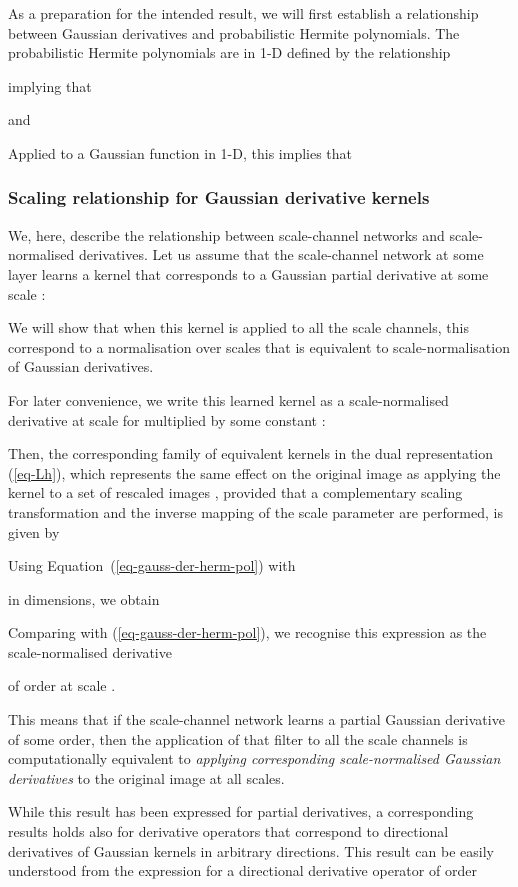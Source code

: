 \documentclass[twocolumn,runningheads]{svjour3}
\begin{document}
As a preparation for the intended result, we will first establish a
relationship between Gaussian derivatives and probabilistic Hermite
polynomials.
The probabilistic Hermite polynomials  are in 1-D defined by the
relationship

implying that

and 

Applied to a Gaussian function in 1-D, this implies that


\subsubsection{Scaling relationship for Gaussian derivative kernels}
\label{sec:relation-to-scale-space2}

We, here, describe the relationship between scale-channel networks and
scale-normalised derivatives. Let us assume that the scale-channel network at some layer learns a kernel that corresponds to a Gaussian partial derivative at
some scale :

We will show that when this kernel is applied to all the scale
channels, this correspond to a normalisation over scales that is equivalent to scale-normalisation of Gaussian derivatives. 

For later convenience, we write this learned kernel as a scale-normalised
derivative at scale  for  multiplied by some constant :

Then, the corresponding family of equivalent kernels  in the dual
representation (\ref{eq-Lh}), 
which represents the same effect on the original image as applying the kernel  
to a set of rescaled images ,
provided that a 
complementary scaling transformation and the inverse mapping of the
scale parameter  are performed, is given by

Using Equation~(\ref{eq-gauss-der-herm-pol}) with 

in  dimensions, we obtain

Comparing with (\ref{eq-gauss-der-herm-pol}), we recognise this
expression as the scale-normalised derivative

of order  at scale .

This means that if the scale-channel network learns a partial Gaussian
derivative of some order, then the application of that filter to all
the scale channels is computationally equivalent to 
{\em applying corresponding scale-normalised Gaussian derivatives\/}
to the original image at all scales.

While this result has been expressed for partial derivatives, a
corresponding results holds also for derivative operators that
correspond to directional derivatives of Gaussian kernels in arbitrary
directions.
This result can be easily understood from the expression for a
directional derivative operator  of order 
 
\end{document}
